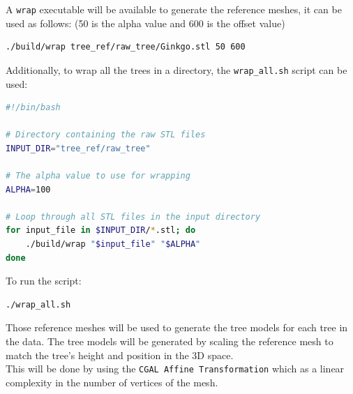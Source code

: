 \documentclass[12pt]{article}
\begin{document}
A \texttt{wrap} executable will be available to generate the reference meshes, it 
can be used as follows:
(50 is the alpha value and 600 is the offset value)

\begin{lstlisting}[language=bash]
./build/wrap tree_ref/raw_tree/Ginkgo.stl 50 600
\end{lstlisting}


Additionally, to wrap all the trees in a directory, the \texttt{wrap\_all.sh} script
can be used:

\begin{lstlisting}[language=bash]
#!/bin/bash

# Directory containing the raw STL files
INPUT_DIR="tree_ref/raw_tree"

# The alpha value to use for wrapping
ALPHA=100

# Loop through all STL files in the input directory
for input_file in $INPUT_DIR/*.stl; do
	./build/wrap "$input_file" "$ALPHA"
done
\end{lstlisting}

To run the script:
\begin{lstlisting}
./wrap_all.sh
\end{lstlisting}

   Those reference meshes will be used to generate the tree models for each tree 
in the data. The tree models will be generated by scaling the reference mesh 
to match the tree's height and position in the 3D space. \\
This will be done by using the \texttt{CGAL Affine Transformation} \cite{cgal_affine_transformation}
which as a linear complexity in the number of vertices of the mesh.
\end{document}
